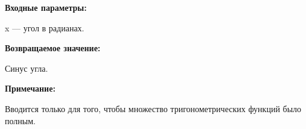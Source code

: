 \textbf{Входные параметры:}

 x --- угол в радианах.

\textbf{Возвращаемое значение:}

Синус угла.

\textbf{Примечание:}

 Вводится только для того, чтобы множество тригонометрических функций было полным.